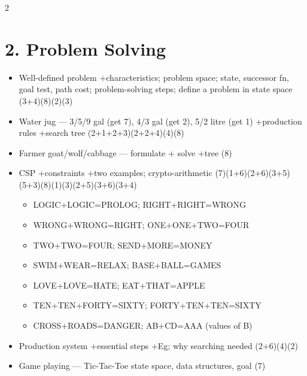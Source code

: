 \documentclass[10pt]{article}
\begin{document}
\begin{multicols}{2}
\section*{2. Problem Solving}
\begin{itemize}
  \item Well-defined problem +characteristics; problem space; state, successor fn, goal test, path cost; problem-solving steps; define a problem in state space \hfill (3+4)(8)(2)(3)
  \item Water jug --- 3/5/9 gal (get 7), 4/3 gal (get 2), 5/2 litre (get 1) +production rules +search tree \hfill (2+1+2+3)(2+2+4)(4)(8)
  \item Farmer goat/wolf/cabbage --- formulate + solve +tree \hfill (8)
  \item CSP +constraints +two examples; crypto-arithmetic \hfill (7)(1+6)(2+6)(3+5)(5+3)(8)(1)(3)(2+5)(3+6)(3+4)
    \begin{itemize}
      \item LOGIC+LOGIC=PROLOG; RIGHT+RIGHT=WRONG
      \item WRONG+WRONG=RIGHT; ONE+ONE+TWO=FOUR
      \item TWO+TWO=FOUR; SEND+MORE=MONEY
      \item SWIM+WEAR=RELAX; BASE+BALL=GAMES
      \item LOVE+LOVE=HATE; EAT+THAT=APPLE
      \item TEN+TEN+FORTY=SIXTY; FORTY+TEN+TEN=SIXTY
      \item CROSS+ROADS=DANGER; AB+CD=AAA (values of B)
    \end{itemize}
  \item Production system +essential steps +Eg; why searching needed \hfill (2+6)(4)(2)
  \item Game playing --- Tic-Tac-Toe state space, data structures, goal \hfill (7)
\end{itemize}


\end{multicols}
\end{document}

